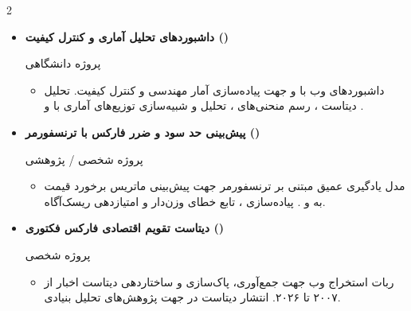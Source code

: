 \documentclass[10pt,a4paper]{article}
\newenvironment{projdesc}{%
  \begin{itemize}[nosep, leftmargin=1.2em, itemindent=0pt,
                  itemsep=1pt, topsep=2pt, font=\small]%
}{\end{itemize}}
\newenvironment{cvblock}{%
  \begin{itemize}[label={}, leftmargin=0pt, itemindent=0pt,
                  nosep, itemsep=8pt, topsep=0pt]%
}{\end{itemize}}
\begin{document}
\begin{paracol}{2}
\begin{cvblock}
\item \textbf{\color{primary}داشبوردهای تحلیل آماری و کنترل کیفیت ()}\par
{\small\color{textbody}پروژه دانشگاهی}\par
\begin{projdesc}
  \item داشبوردهای وب با  و  جهت پیاده‌سازی آمار مهندسی و کنترل کیفیت. تحلیل دیتاست ، رسم منحنی‌های ، تحلیل  و شبیه‌سازی توزیع‌های آماری با  و .
\end{projdesc}
\vspace{2pt}
\hfill{}
\end{cvblock}

\begin{cvblock}
\item \textbf{\color{primary}پیش‌بینی حد سود و ضرر فارکس با ترنسفورمر ()}\par
{\small\color{textbody}پروژه شخصی / پژوهشی}\par
\begin{projdesc}
  \item مدل یادگیری عمیق مبتنی بر ترنسفورمر جهت پیش‌بینی ماتریس برخورد قیمت به  و . پیاده‌سازی ، تابع خطای  وزن‌دار و امتیازدهی ریسک‌آگاه.
\end{projdesc}
\vspace{2pt}
\hfill{}
\end{cvblock}

\begin{cvblock}
\item \textbf{\color{primary}دیتاست تقویم اقتصادی فارکس فکتوری ()}\par
{\small\color{textbody}پروژه شخصی}\par
\begin{projdesc}
  \item ربات استخراج وب جهت جمع‌آوری، پاک‌سازی و ساختاردهی دیتاست اخبار  از ۲۰۰۷ تا ۲۰۲۶. انتشار دیتاست در  جهت پژوهش‌های تحلیل بنیادی.
\end{projdesc}
\vspace{2pt}
\hfill{}
\end{cvblock}


\end{paracol}
\end{document}

